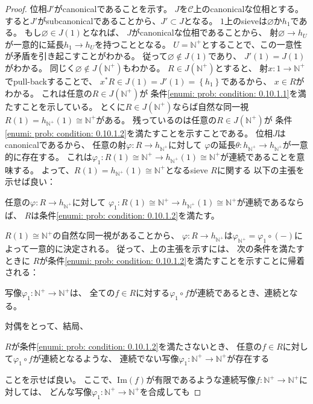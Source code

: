 \documentclass[uplatex]{jsarticle}
\theoremstyle{definition}
\renewcommand{\emptyset}{\varnothing}
\newcommand{\im}{\mathrm{Im}}
\def\N{\mathbb{N}}
\def\mcC{\mathcal{C}}
\begin{document}
\begin{proof}
  位相\(J'\)がcanonicalであることを示す。
  \(J\)を\(\mcC\)上のcanonicalな位相とする。
  すると\(J'\)がsubcanonicalであることから、\(J'\subset J\)となる。
  \(1\)上のsieveは\(\emptyset\)か\(h_1\)である。
  もし\(\emptyset\in J(1)\)となれば、
  \(J\)がcanonicalな位相であることから、
  射\(\emptyset \to h_U\)が一意的に延長\(h_1\to h_U\)を持つこととなる。
  \(U=\N^+\)とすることで、この一意性が矛盾を引き起こすことがわかる。
  従って\(\emptyset \not\in J(1)\)であり、
  \(J'(1) = J(1)\)がわかる。
  同じく\(\emptyset\not\in J(\N^+)\)もわかる。
  \(R\in J(\N^+)\)とすると、
  射\(x:1\to \N^+\)でpull-backすることで、
  \(x^*R \in J(1) = J'(1) = \left\{ h_1\right\}\)であるから、
  \(x\in R\)がわかる。
  これは任意の\(R\in J(\N^+)\)が
  条件\ref{enumi: prob: condition: 0.10.1.1}を満たすことを示している。
  とくに\(R\in J(\N^+)\)ならば自然な同一視\(R(1) = h_{\N^+}(1) \cong \N^+\)がある。
  残っているのは任意の\(R\in J(\N^+)\)が
  条件\ref{enumi: prob: condition: 0.10.1.2}を満たすことを示すことである。
  位相\(J\)はcanonicalであるから、
  任意の射\(\varphi:R\to h_{\N^+}\)に対して
  \(\varphi\)の延長\(\theta:h_{\N^+}\to h_{\N^+}\)が一意的に存在する。
  これは\(\varphi_1:R(1) \cong \N^+ \to h_{\N^+}(1) \cong \N^+\)が連続であることを意味する。
  よって、\(R(1) = h_{\N^+}(1) \cong \N^+\)となるsieve \(R\)に関する
  以下の主張を示せば良い：
  \begin{center}
    任意の\(\varphi:R\to h_{\N^+}\)に対して
    \(\varphi_1:R(1) \cong \N^+ \to h_{\N^+}(1) \cong \N^+\)が連続であるならば、
    \(R\)は条件\ref{enumi: prob: condition: 0.10.1.2}を満たす。
  \end{center}
  \(R(1) \cong \N^+\)の自然な同一視があることから、
  \(\varphi:R\to h_{\N^+}\)は\(\varphi_{\N^+} = \varphi_1\circ (-)\)によって一意的に決定される。
  従って、上の主張を示すには、
  次の条件を満たすときに
  \(R\)が条件\ref{enumi: prob: condition: 0.10.1.2}を満たすことを示すことに帰着される：
  \begin{center}
    写像\(\varphi_1:\N^+\to \N^+\)は、
    全ての\(f\in R\)に対する\(\varphi_1\circ f\)が連続であるとき、連続となる。
  \end{center}
  対偶をとって、結局、
  \begin{center}
    \(R\)が条件\ref{enumi: prob: condition: 0.10.1.2}を満たさないとき、
    任意の\(f\in R\)に対して\(\varphi_1\circ f\)が連続となるような、
    連続でない写像\(\varphi_1:\N^+\to \N^+\)が存在する
  \end{center}
  ことを示せば良い。
  ここで、\(\im(f)\)が有限であるような連続写像\(f:\N^+\to \N^+\)に対しては、
  どんな写像\(\varphi_1:\N^+\to \N^+\)を合成しても

\end{proof}
\end{document}
